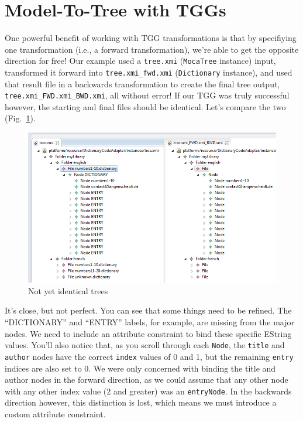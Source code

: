\newpage
\section{Model-To-Tree with TGGs}
\genHeader

One powerful benefit of working with TGG transformations is that by specifiying one transformation (i.e., a forward transformation), we're able to get the
opposite direction for free! Our example used a \texttt{tree.xmi} (\texttt{MocaTree}
instance) input, transformed it forward into \texttt{tree.xmi\_fwd.xmi} (\texttt{Dictionary} instance), and used that result file in a backwards
transformation to create the final tree output, \texttt{tree.xmi\_FWD.xmi\_BWD.xmi}, all without error! If our TGG was truly successful however,
the starting and final files should be identical. Let's compare the two (Fig.~\ref{eclipse:comparingTreeModels}).

\vspace{0.5cm}

\begin{figure}[htpb]
\begin{center}
  \includegraphics[width=\textwidth]{eclipse_generatedBackwardsModel}
  \caption{Not yet identical trees}
  \label{eclipse:comparingTreeModels}
\end{center}
\end{figure}

\vspace{0.5cm}

It's close, but not perfect. You can see that some things need to be refined. The ``DICTIONARY'' and ``ENTRY'' labels, for example, are missing from the
major nodes. We need to include an attribute constraint to bind these specific EString values. You'll also notice that, as you scroll through each
\texttt{Node}, the \texttt{title} and \texttt{author} nodes have the correct \texttt{index} values of 0 and 1, but the remaining \texttt{entry} indices are also
set to 0.
We were only concerned with binding the title and author nodes in the forward direction, as we could assume that any other node with any other index value (2 and greater) was an
\texttt{entryNode}. In the backwards direction however, this distinction is lost, which means we must introduce a custom attribute constraint.







